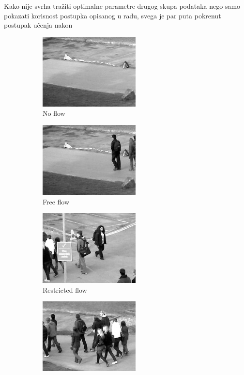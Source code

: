 \documentclass[times, utf8, zavrsni]{fer}
\begin{document}
\bigbreak

Kako nije svrha tražiti optimalne parametre drugog skupa podataka nego samo pokazati 
korisnost postupka opisanog u radu, svega je par puta pokrenut postupak učenja nakon 

\begin{figure}[ht]
	\begin{subfigure}[b]{0.19\linewidth}
		\centering
		\includegraphics[scale=0.5]{img/noflow.jpg}
		\caption{No flow}
	\end{subfigure}
	\begin{subfigure}[b]{0.19\linewidth}
		\centering
		\includegraphics[scale=0.5]{img/freeflow.jpg}
		\caption{Free flow}
	\end{subfigure}
	\begin{subfigure}[b]{0.19\linewidth}
		\centering
		\includegraphics[scale=0.5]{img/restrictedflow.jpg}
		\caption{Restricted flow}
	\end{subfigure}
	\begin{subfigure}[b]{0.19\linewidth}
		\centering
		\includegraphics[scale=0.5]{img/denseflow.jpg}

\end{subfigure}
\end{figure}
\end{document}
